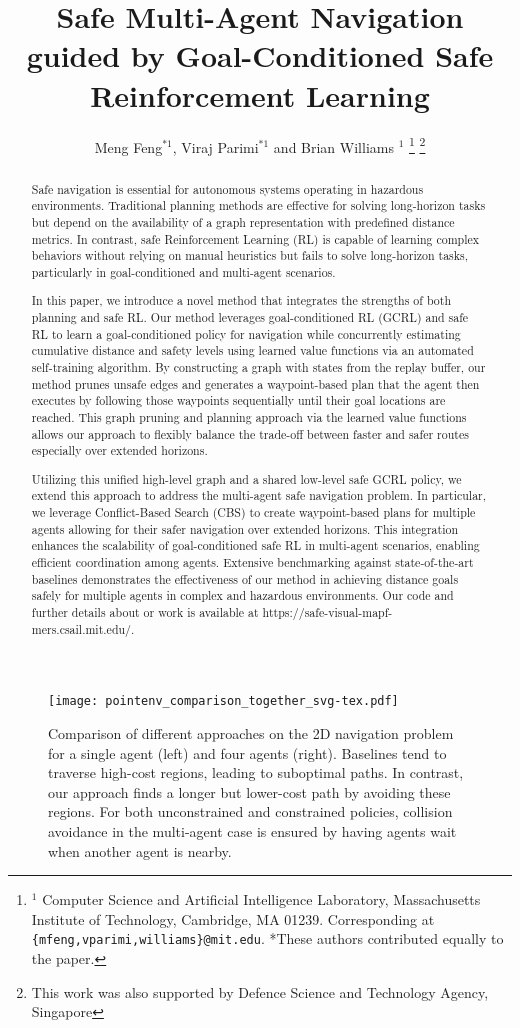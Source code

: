 \documentclass[letterpaper, 10 pt, conference]{IEEEConference}
\title{\LARGE \bf
Safe Multi-Agent Navigation guided by Goal-Conditioned Safe Reinforcement Learning
}
\author{Meng Feng$^{*1}$, Viraj Parimi$^{*1}$ and Brian Williams $^{1}$
\thanks{$^{1}$ Computer Science and Artificial Intelligence Laboratory, Massachusetts Institute of Technology, Cambridge, MA 01239. Corresponding at {\tt\footnotesize \{mfeng,vparimi,williams\}@mit.edu}. *These authors contributed equally to the paper.}
\thanks{This work was also supported by Defence Science and Technology Agency, Singapore}
}
\begin{document}
\maketitle
\thispagestyle{empty}
\pagestyle{empty}

\begin{abstract}
Safe navigation is essential for autonomous systems operating in hazardous environments. Traditional planning methods are effective for solving long-horizon tasks but depend on the availability of a graph representation with predefined distance metrics. In contrast, safe Reinforcement Learning (RL) is capable of learning complex behaviors without relying on manual heuristics but fails to solve long-horizon tasks, particularly in goal-conditioned and multi-agent scenarios.

In this paper, we introduce a novel method that integrates the strengths of both planning and safe RL. Our method leverages goal-conditioned RL (GCRL) and safe RL to learn a goal-conditioned policy for navigation while concurrently estimating cumulative distance and safety levels using learned value functions via an automated self-training algorithm. By constructing a graph with states from the replay buffer, our method prunes unsafe edges and generates a waypoint-based plan that the agent then executes by following those waypoints sequentially until their goal locations are reached. This graph pruning and planning approach via the learned value functions allows our approach to flexibly balance the trade-off between faster and safer routes especially over extended horizons.

Utilizing this unified high-level graph and a shared low-level safe GCRL policy, we extend this approach to address the multi-agent safe navigation problem. In particular, we leverage Conflict-Based Search (CBS) to create waypoint-based plans for multiple agents allowing for their safer navigation over extended horizons. This integration enhances the scalability of goal-conditioned safe RL in multi-agent scenarios, enabling efficient coordination among agents. Extensive benchmarking against state-of-the-art baselines demonstrates the effectiveness of our method in achieving distance goals safely for multiple agents in complex and hazardous environments. Our code and further details about or work is available at https://safe-visual-mapf-mers.csail.mit.edu/.
\end{abstract}

\begin{figure*}[t]
    \centering  
    \texttt{[image: pointenv\_comparison\_together\_svg-tex.pdf]}
    \caption{Comparison of different approaches on the 2D navigation problem for a single agent (left) and four agents (right). Baselines tend to traverse high-cost regions, leading to suboptimal paths. In contrast, our approach finds a longer but lower-cost path by avoiding these regions. For both unconstrained and constrained policies, collision avoidance in the multi-agent case is ensured by having agents wait when another agent is nearby.}
    \label{fig:pointenv_illustration_together}
\end{figure*}
\end{document}
